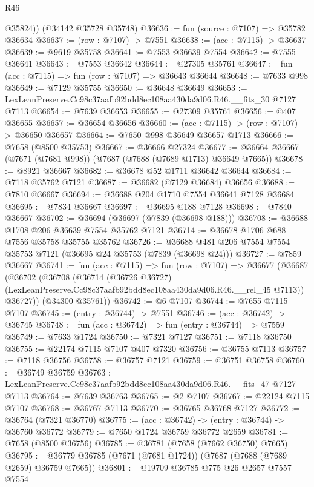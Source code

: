 \begin{lexlean}{R46}
\begin{coremodule}
        @35824))
    (@34142 @35728 @35748)
@36636 := fun (source : @7107) => @35782 @36634
@36637 := (row : @7107) -> @7551
@36638 := (acc : @7115) -> @36637
@36639 := @9619 @35758
@36641 := @7553 @36639 @7554
@36642 := @7555 @36641
@36643 := @7553 @36642
@36644 := @27305 @35761
@36647 := fun (acc : @7115) => fun (row : @7107) => @36643 @36644
@36648 := @7633 @998
@36649 := @7129 @35755
@36650 := @36648 @36649
@36653 := LexLeanPreserve.Cc98c37aafb92bdd8ec108aa430da9d06.R46.__fits_30 @7127 @7113
@36654 := @7639 @36653
@36655 := @27309 @35761
@36656 := @407 @36655
@36657 := @36654 @36656
@36660 := (acc : @7115) -> (row : @7107) -> @36650 @36657
@36664 := @7650 @998 @36649 @36657 @1713
@36666 := @7658 (@8500 @35753)
@36667 := @36666 @27324
@36677 := @36664 @36667 (@7671 (@7681 @998)) (@7687 (@7688 (@7689 @1713) @36649 @7665))
@36678 := @8921 @36667
@36682 := @36678 @52 @1711 @36642 @36644
@36684 := @7118 @35762 @7121
@36687 := @36682 (@7129 @36684) @36656
@36688 := @7810 @36667
@36694 := @36688 @204 @1710 @7554 @36641 @7128 @36684
@36695 := @7834 @36667
@36697 := @36695 @188 @7128
@36698 := @7840 @36667
@36702 := @36694 (@36697 (@7839 (@36698 @188)))
@36708 := @36688 @1708 @206 @36639 @7554 @35762 @7121
@36714 := @36678 @1706 @688 @7556 @35758 @35755 @35762
@36726 := @36688 @481 @206 @7554 @7554 @35753 @7121 (@36695 @24 @35753 (@7839 (@36698 @24)))
@36727 := @7859 @36667
@36741 := fun (acc : @7115) =>
  fun (row : @7107) =>
  @36677
    (@36687
      (@36702
        (@36708
          (@36714
            (@36726 @36727)
            (LexLeanPreserve.Cc98c37aafb92bdd8ec108aa430da9d06.R46.__rel_45 @7113))
          @36727))
      (@34300 @35761))
@36742 := @6 @7107
@36744 := @7655 @7115 @7107
@36745 := (entry : @36744) -> @7551
@36746 := (acc : @36742) -> @36745
@36748 := fun (acc : @36742) => fun (entry : @36744) => @7559
@36749 := @7633 @1724
@36750 := @7321 @7127
@36751 := @7118 @36750
@36755 := @22174 @7115 @7107 @407 @7320
@36756 := @36755 @7113
@36757 := @7118 @36756
@36758 := @36757 @7121
@36759 := @36751 @36758
@36760 := @36749 @36759
@36763 := LexLeanPreserve.Cc98c37aafb92bdd8ec108aa430da9d06.R46.__fits_47 @7127 @7113
@36764 := @7639 @36763
@36765 := @2 @7107
@36767 := @22124 @7115 @7107
@36768 := @36767 @7113
@36770 := @36765 @36768 @7127
@36772 := @36764 (@7321 @36770)
@36775 := (acc : @36742) -> (entry : @36744) -> @36760 @36772
@36779 := @7650 @1724 @36759 @36772 @2659
@36781 := @7658 (@8500 @36756)
@36785 := @36781 (@7658 (@7662 @36750) @7665)
@36795 := @36779 @36785 (@7671 (@7681 @1724)) (@7687 (@7688 (@7689 @2659) @36759 @7665))
@36801 := @19709 @36785 @775 @26 @2657 @7557 @7554

\end{coremodule}
\end{lexlean}

